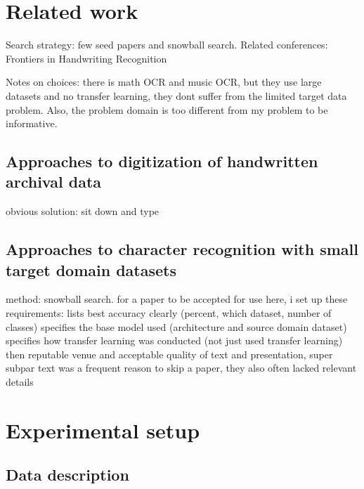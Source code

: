 \documentclass{article}
\begin{document}
\section{Related work}


Search strategy: few seed papers and snowball search. Related conferences: 
Frontiers in Handwriting Recognition

Notes on choices: there is math OCR and music OCR, but they use large datasets and no transfer learning, they dont suffer from the limited target data problem. Also, the problem domain is too different from my problem to be informative.

\subsection{Approaches to digitization of handwritten archival data}

obvious solution: sit down and type

\subsection{Approaches to character recognition with small target domain datasets}

method: snowball search. for a paper to be accepted for use here, i set up these requirements:
lists best accuracy clearly (percent, which dataset, number of classes)
specifies the base model used (architecture and source domain dataset)
specifies how transfer learning was conducted (not just used transfer learning)
then reputable venue and acceptable quality of text and presentation, super subpar text was a frequent reason to skip a paper, they also often lacked relevant details

\section{Experimental setup}


\subsection{Data description}
\end{document}
